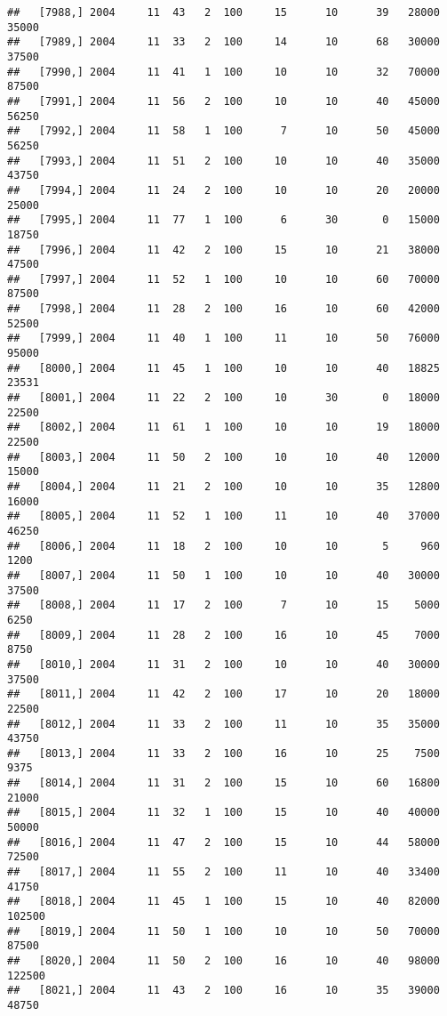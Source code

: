 \documentclass{article}\usepackage[]{graphicx}\usepackage[]{color}
\makeatletter
\newenvironment{kframe}{%
 \def\at@end@of@kframe{}%
 \ifinner\ifhmode%
  \def\at@end@of@kframe{\end{minipage}}%
  \begin{minipage}{\columnwidth}%
 \fi\fi%
 \def\FrameCommand##1{\hskip\@totalleftmargin \hskip-\fboxsep
 \colorbox{shadecolor}{##1}\hskip-\fboxsep
     \hskip-\linewidth \hskip-\@totalleftmargin \hskip\columnwidth}%
 \MakeFramed {\advance\hsize-\width
   \@totalleftmargin\z@ \linewidth\hsize
   \@setminipage}}%
 {\par\unskip\endMakeFramed%
 \at@end@of@kframe}
\newenvironment{knitrout}{}{} %
\makeatother
\begin{document}
\begin{knitrout}
\begin{kframe}
\begin{verbatim}
##   [7988,] 2004     11  43   2  100     15      10      39   28000   35000
##   [7989,] 2004     11  33   2  100     14      10      68   30000   37500
##   [7990,] 2004     11  41   1  100     10      10      32   70000   87500
##   [7991,] 2004     11  56   2  100     10      10      40   45000   56250
##   [7992,] 2004     11  58   1  100      7      10      50   45000   56250
##   [7993,] 2004     11  51   2  100     10      10      40   35000   43750
##   [7994,] 2004     11  24   2  100     10      10      20   20000   25000
##   [7995,] 2004     11  77   1  100      6      30       0   15000   18750
##   [7996,] 2004     11  42   2  100     15      10      21   38000   47500
##   [7997,] 2004     11  52   1  100     10      10      60   70000   87500
##   [7998,] 2004     11  28   2  100     16      10      60   42000   52500
##   [7999,] 2004     11  40   1  100     11      10      50   76000   95000
##   [8000,] 2004     11  45   1  100     10      10      40   18825   23531
##   [8001,] 2004     11  22   2  100     10      30       0   18000   22500
##   [8002,] 2004     11  61   1  100     10      10      19   18000   22500
##   [8003,] 2004     11  50   2  100     10      10      40   12000   15000
##   [8004,] 2004     11  21   2  100     10      10      35   12800   16000
##   [8005,] 2004     11  52   1  100     11      10      40   37000   46250
##   [8006,] 2004     11  18   2  100     10      10       5     960    1200
##   [8007,] 2004     11  50   1  100     10      10      40   30000   37500
##   [8008,] 2004     11  17   2  100      7      10      15    5000    6250
##   [8009,] 2004     11  28   2  100     16      10      45    7000    8750
##   [8010,] 2004     11  31   2  100     10      10      40   30000   37500
##   [8011,] 2004     11  42   2  100     17      10      20   18000   22500
##   [8012,] 2004     11  33   2  100     11      10      35   35000   43750
##   [8013,] 2004     11  33   2  100     16      10      25    7500    9375
##   [8014,] 2004     11  31   2  100     15      10      60   16800   21000
##   [8015,] 2004     11  32   1  100     15      10      40   40000   50000
##   [8016,] 2004     11  47   2  100     15      10      44   58000   72500
##   [8017,] 2004     11  55   2  100     11      10      40   33400   41750
##   [8018,] 2004     11  45   1  100     15      10      40   82000  102500
##   [8019,] 2004     11  50   1  100     10      10      50   70000   87500
##   [8020,] 2004     11  50   2  100     16      10      40   98000  122500
##   [8021,] 2004     11  43   2  100     16      10      35   39000   48750

\end{verbatim}
\end{kframe}
\end{knitrout}
\end{document}
